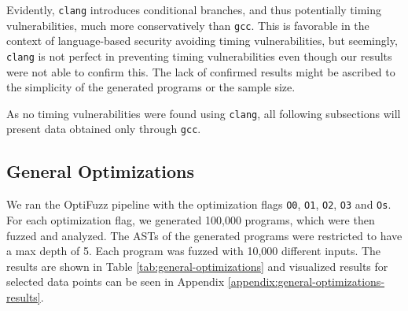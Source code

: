 Evidently, \texttt{clang} introduces conditional branches, and thus potentially timing vulnerabilities, much more conservatively than \texttt{gcc}. 
This is favorable in the context of language-based security avoiding timing vulnerabilities, but seemingly, \texttt{clang} is not perfect in preventing timing vulnerabilities even though our results were not able to confirm this. 
The lack of confirmed results might be ascribed to the simplicity of the generated programs or the sample size.

As no timing vulnerabilities were found using \texttt{clang}, all following subsections will present data obtained only through \texttt{gcc}.

\subsection{General Optimizations}
\label{sec:general-optimizations}
We ran the OptiFuzz pipeline with the optimization flags \texttt{O0}, \texttt{O1}, \texttt{O2}, \texttt{O3} and \texttt{Os}. 
For each optimization flag, we generated 100,000 programs, which were then fuzzed and analyzed. 
The ASTs of the generated programs were restricted to have a max depth of 5.
Each program was fuzzed with 10,000 different inputs.
The results are shown in Table \ref{tab:general-optimizations} and visualized results for selected data points can be seen in Appendix \ref{appendix:general-optimizations-results}.

